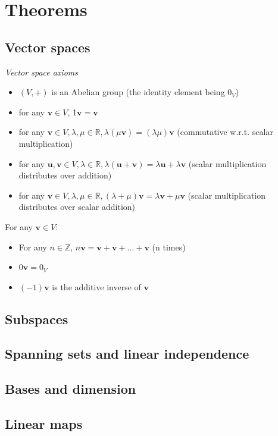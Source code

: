 \documentclass{article}
\newcommand{\R}{\mathbb{R}}
\newcommand{\Z}{\mathbb{Z}}
\renewcommand{\vec}[1]{\mathbf{#1}}
\begin{document}
\section{Theorems}

\subsection{Vector spaces}
\textit{Vector space axioms}
\begin{itemize}
\item $ (V, +) $ is an Abelian group (the identity element being $ 0_{V} $)
\item for any $ \vec{v} \in V $, 1$ \vec{v} = \vec{v} $
\item for any $ \vec{v} \in V, \lambda, \mu \in \R, \lambda (\mu \vec{v}) = (\lambda \mu) \vec{v} $ (commutative w.r.t. scalar multiplication)
\item for any $ \vec{u}, \vec{v} \in V, \lambda \in \R, \lambda (\vec{u}  + \vec{v}) = \lambda \vec{u}  + \lambda \vec{v} $ (scalar multiplication distributes over addition)
\item for any $ \vec{v} \in V, \lambda, \mu \in \R, (\lambda + \mu) \vec{v} = \lambda \vec{v}  + \mu \vec{v} $ (scalar multiplication distributes over scalar addition)
\end{itemize}
For any $ \vec{v} \in V $:
\begin{itemize}
\item For any $ n \in \Z $, $ n\vec{v} = \vec{v} + \vec{v} + ... + \vec{v} $ (n times)
\item $ 0 \vec{v} = 0_{V} $
\item $ (-1) \vec{v} $ is the additive inverse of $ \vec{v} $
\end{itemize}

\subsection{Subspaces}

\subsection{Spanning sets and linear independence}

\subsection{Bases and dimension}

\subsection{Linear maps}
\end{document}
